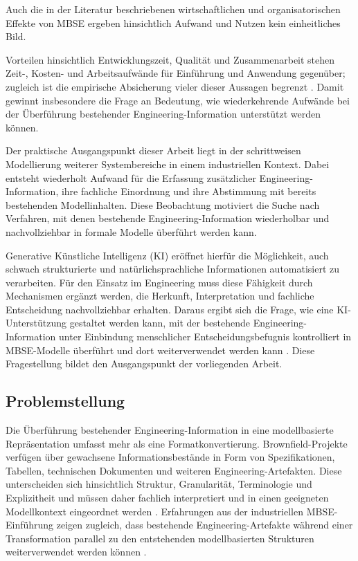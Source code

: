 Auch die in der Literatur beschriebenen wirtschaftlichen und
organisatorischen Effekte von MBSE ergeben hinsichtlich Aufwand und Nutzen
kein einheitliches Bild. 

Vorteilen hinsichtlich Entwicklungszeit, Qualität
und Zusammenarbeit stehen Zeit-, Kosten- und Arbeitsaufwände für Einführung
und Anwendung gegenüber; zugleich ist die empirische Absicherung vieler
dieser Aussagen begrenzt \cite{Campo2023}. Damit gewinnt insbesondere die
Frage an Bedeutung, wie wiederkehrende Aufwände bei der Überführung
bestehender Engineering-Information unterstützt werden können.

Der praktische Ausgangspunkt dieser Arbeit liegt in der schrittweisen
Modellierung weiterer Systembereiche in einem industriellen Kontext. Dabei
entsteht wiederholt Aufwand für die Erfassung zusätzlicher
Engineering-Information, ihre fachliche Einordnung und ihre Abstimmung mit
bereits bestehenden Modellinhalten. Diese Beobachtung motiviert die Suche
nach Verfahren, mit denen bestehende Engineering-Information wiederholbar und
nachvollziehbar in formale Modelle überführt werden kann.

Generative Künstliche Intelligenz (KI) eröffnet hierfür die Möglichkeit,
auch schwach strukturierte und natürlichsprachliche Informationen
automatisiert zu verarbeiten. Für den Einsatz im Engineering muss diese
Fähigkeit durch Mechanismen ergänzt werden, die Herkunft, Interpretation und
fachliche Entscheidung nachvollziehbar erhalten. Daraus ergibt sich die
Frage, wie eine KI-Unterstützung gestaltet werden kann, mit der bestehende
Engineering-Information unter Einbindung menschlicher
Entscheidungsbefugnis kontrolliert in MBSE-Modelle überführt und dort
weiterverwendet werden kann \cite{SheardPickard2025}. Diese Fragestellung
bildet den Ausgangspunkt der vorliegenden Arbeit.


\subsection{Problemstellung}
\label{sec:problemstellung}

Die Überführung bestehender Engineering-Information in eine modellbasierte
Repräsentation umfasst mehr als eine Formatkonvertierung. Brownfield-Projekte
verfügen über gewachsene Informationsbestände in Form von Spezifikationen,
Tabellen, technischen Dokumenten und weiteren Engineering-Artefakten. Diese
unterscheiden sich hinsichtlich Struktur, Granularität, Terminologie und
Explizitheit und müssen daher fachlich interpretiert und in einen geeigneten
Modellkontext eingeordnet werden \cite{Bressan.2000}. Erfahrungen aus der
industriellen MBSE-Einführung zeigen zugleich, dass bestehende
Engineering-Artefakte während einer Transformation parallel zu den
entstehenden modellbasierten Strukturen weiterverwendet werden können
\cite{Henderson2024}.

